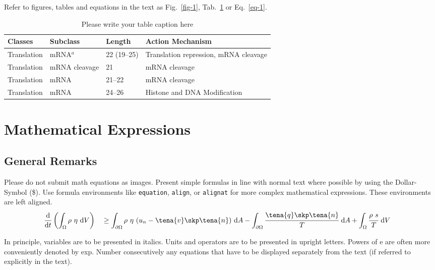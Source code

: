 \documentclass{techmech}
\begin{document}
Refer to figures, tables and equations in the text as Fig.~\ref{fig-1}, Tab.~\ref{tab-1} or Eq.~\eqref{eq-1}.
\begin{table}[b!]
\caption{Please write your table caption here}
\label{tab-1} 
\begin{tabularx}{\textwidth}{p{2cm}XXX} 
\hline%
Classes & Subclass & Length & Action Mechanism  \\
\hline
Translation & mRNA$^a$  & 22 (19--25) & Translation repression, mRNA cleavage\\
Translation & mRNA cleavage & 21 & mRNA cleavage\\
Translation & mRNA  & 21--22 & mRNA cleavage\\
Translation & mRNA  & 24--26 & Histone and DNA Modification\\
\hline
\end{tabularx}
\end{table}

\section{Mathematical Expressions}
\subsection{General Remarks} 
Please do not submit math equations as images. Present simple formulas in
line with normal text where possible by using the Dollar-Symbol (\$). Use formula environments like \texttt{equation}, \texttt{align}, or  \texttt{alignat} for more complex mathematical expressions. These environments are left aligned.
\begin{alignat}{3}
&{\frac{\mathrm{d}}{\mathrm{d}t}}
\left(\int _{\Omega }\rho ~\eta ~{\mathrm{d}V}\right)
&&\geq \int _{\partial \Omega }\rho ~\eta ~(u_{n}-\tena{v} \skp \tena{n} )~{\mathrm{d}A}
-\int _{\partial \Omega }{\cfrac {\tena{q} \skp \tena{n} }{T}}~{\mathrm{d}A}+\int _{\Omega }{\cfrac {\rho ~s}{T}}~{\mathrm{d}V}
\label{eq-1}
\end{alignat}

In principle, variables are to be presented in italics. Units and operators are to be presented in upright letters.  Powers of e are often more conveniently denoted by exp. Number consecutively any equations that have to be displayed separately from the text (if referred to explicitly in the text).\\
\end{document}
